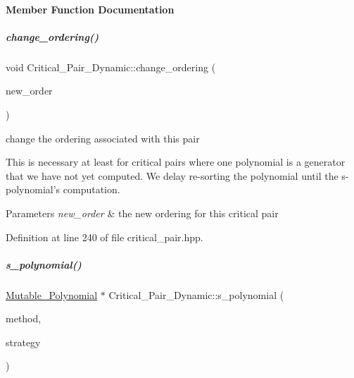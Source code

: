 \paragraph{Member Function Documentation}
\mbox{\label{group___g_b_computation_aa9001ca49b2c2fd7d39384e4e70c5a6b}} 
\subparagraph{\texorpdfstring{change\+\_\+ordering()}{change\_ordering()}}
{\footnotesize\ttfamily void Critical\+\_\+\+Pair\+\_\+\+Dynamic\+::change\+\_\+ordering (\begin{DoxyParamCaption}\item[{\hyperlink{group__orderinggroup_class_weighted___ordering}{Weighted\+\_\+\+Ordering} $\ast$}]{new\+\_\+order }\end{DoxyParamCaption})\hspace{0.3cm}{\ttfamily [inline]}}



change the ordering associated with this pair 

This is necessary at least for critical pairs where one polynomial is a generator that we have not yet computed. We delay re-\/sorting the polynomial until the s-\/polynomial's computation. 
\begin{DoxyParams}{Parameters}
{\em new\+\_\+order} & the new ordering for this critical pair \\
\hline
\end{DoxyParams}


Definition at line 240 of file critical\+\_\+pair.\+hpp.

\mbox{\label{group___g_b_computation_a3146fa294ea814d5388e09b1c76c966b}} 
\subparagraph{\texorpdfstring{s\+\_\+polynomial()}{s\_polynomial()}}
{\footnotesize\ttfamily \hyperlink{group__polygroup_class_mutable___polynomial}{Mutable\+\_\+\+Polynomial} $\ast$ Critical\+\_\+\+Pair\+\_\+\+Dynamic\+::s\+\_\+polynomial (\begin{DoxyParamCaption}\item[{\hyperlink{group___g_b_computation_ga73257b8a2d5cc826853a71b77d0cebf2}{S\+Poly\+Creation\+Flags}}]{method,  }\item[{\hyperlink{group__strategygroup_ga0ee6c8e033547330e6b89929730007f4}{Strategy\+Flags}}]{strategy }\end{DoxyParamCaption})\hspace{0.3cm}{\ttfamily [virtual]}}



